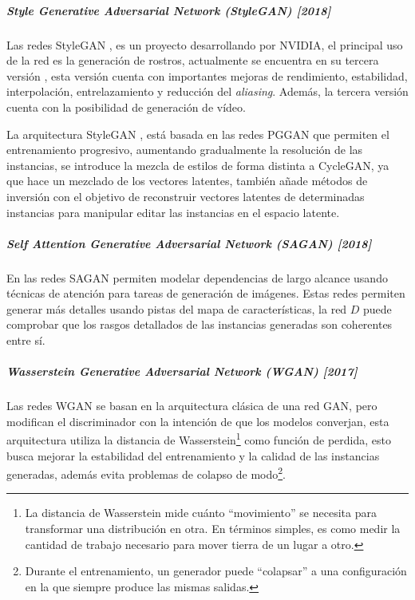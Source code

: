 \subparagraph{Style Generative Adversarial Network (StyleGAN) [2018]}

Las redes \gls{StyleGAN} \cite{StyleGAN-karras2019stylebased,StyleGAN-sauer2023stylegant}, es un proyecto desarrollando por NVIDIA, el principal uso de la red es la generación de rostros, actualmente se encuentra en su tercera versión \cite{styleGAN3-karras2021aliasfree}, esta versión cuenta con importantes mejoras de rendimiento, estabilidad, interpolación, entrelazamiento y reducción del \textit{aliasing}. Además, la tercera versión cuenta con la posibilidad de generación de vídeo.

La arquitectura \gls{StyleGAN} \cite{StyleGAN-melnik2023face}, está basada en las redes \gls{PGGAN} que permiten el entrenamiento progresivo, aumentando gradualmente la resolución de las instancias, se introduce la mezcla de estilos de forma distinta a \gls{CycleGAN}, ya que hace un mezclado de los vectores latentes, también añade métodos de inversión con el objetivo de reconstruir vectores latentes de determinadas instancias para manipular editar las instancias en el espacio latente.




\subparagraph{Self Attention Generative Adversarial Network (SAGAN) [2018]}
En las redes \gls{SAGAN} \cite{SAGAN-zhang2018selfattention} permiten modelar dependencias de largo alcance usando técnicas de atención para tareas de generación de imágenes.
Estas redes permiten generar más detalles usando pistas del mapa de características, la red ${D}$ puede comprobar que los rasgos detallados de las instancias generadas son coherentes entre sí.



\subparagraph{Wasserstein Generative Adversarial Network (WGAN) [2017]}
Las redes \gls{WGAN} \cite{WGAN-arjovsky2017wasserstein, WGAN-weng2017gan, WGAN-weng2019gan} se basan en la arquitectura clásica de una red \gls{GAN}, pero modifican el discriminador con la intención de que los modelos converjan, esta arquitectura utiliza la distancia de Wasserstein\footnote{La distancia de Wasserstein mide cuánto ``movimiento'' se necesita para transformar una distribución en otra. En términos simples, es como medir la cantidad de trabajo necesario para mover tierra de un lugar a otro.} como función de perdida, esto busca mejorar la estabilidad del entrenamiento y la calidad de las instancias generadas, además evita problemas de colapso de modo\footnote{Durante el entrenamiento, un generador puede ``colapsar'' a una configuración en la que siempre produce las mismas salidas.}.

